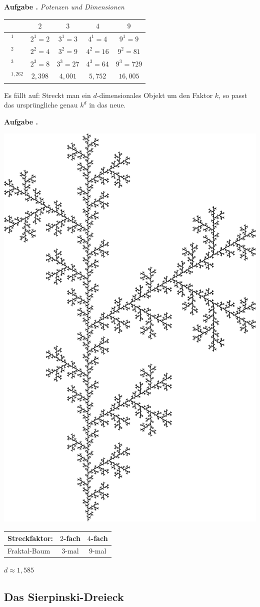 \documentclass[a4paper,ngerman,12pt]{scrartcl}
\theoremstyle{definition}
\theoremstyle{plain}
\theoremstyle{remark}
\newlength{\aufgabenskip}
\newcounter{aufgabennummer}
\newenvironment{aufgabe}[1]{
  \addtocounter{aufgabennummer}{1}
  \textbf{Aufgabe \theaufgabennummer.} \emph{#1} \par
}{\vspace{\aufgabenskip}}
\begin{document}
\begin{aufgabe}{Potenzen und Dimensionen}
\begin{center}
	\renewcommand{\arraystretch}{2}
	\begin{tabular}{l||c|c|c|c}
				      & $2$ & $3$ & $4$ & $9$ \\\hline\hline
		$\boxed{\phantom{1}}^1$  & $2^1=2$	& $3^1=3$ & $4^1=4$  & $9^1=9$ \\\hline
		$\boxed{\phantom{1}}^2$  & $2^2=4$	& $3^2=9$ & $4^2=16$ & $9^2=81$\\\hline
		$\boxed{\phantom{1}}^3$  & $2^3=8$	& $3^3=27$ & $4^3=64$ & $9^3=729$ \\\hline
		$\boxed{\phantom{1}}^{1,262}$  & $2,398$ & $4,001$ & $5,752$ & $16,005$     	
	\end{tabular}
\end{center}

Es fällt auf: Streckt man ein $d$-dimensionales Objekt um den Faktor $k$, so passt das ursprüngliche genau $k^d$ in das neue.
\end{aufgabe}

\begin{aufgabe}{}

	\includegraphics[width=.3\textwidth]{Bilder/Baum.pdf}

	\begin{center}
		\renewcommand{\arraystretch}{2}
		\begin{tabular}{l||c|c}
			Streckfaktor:& $2$-fach & $4$-fach \\\hline\hline
			Fraktal-Baum & $3$-mal & $9$-mal \\	
		\end{tabular}
	\end{center}
	
	$d \approx 1,585$
\end{aufgabe}


\subsection{Das Sierpinski-Dreieck}
\end{document}
